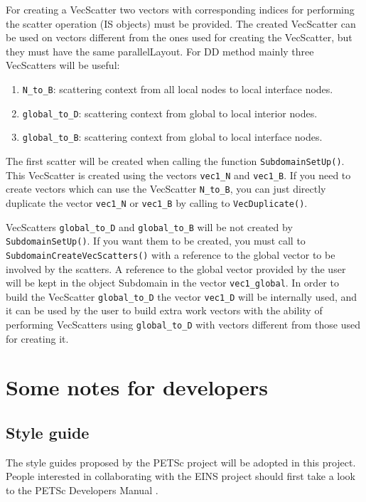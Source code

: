 \documentclass[a4paper,11pt]{report}
\begin{document}
For creating a VecScatter two vectors with corresponding indices
for performing the scatter operation (IS objects) must be
provided. The created VecScatter can be used on vectors different from
the ones used for creating the VecScatter, but they must have the same
parallelLayout. For DD method mainly three VecScatters will be useful:

\begin{enumerate}[noitemsep,topsep=2pt,parsep=2pt,partopsep=2pt]
\item \verb!N_to_B!: scattering context from all local nodes to local interface nodes. 
\item \verb!global_to_D!: scattering context from global to local interior nodes.
\item \verb!global_to_B!: scattering context from global to local interface nodes.
\end{enumerate}

The first scatter will be created when calling the function
\verb!SubdomainSetUp()!. This VecScatter is created using the vectors
\verb!vec1_N! and \verb!vec1_B!. If you need to create vectors which
can use the VecScatter \verb!N_to_B!, you can just directly duplicate
the vector \verb!vec1_N! or \verb!vec1_B! by calling to
\verb!VecDuplicate()!.

VecScatters \verb!global_to_D! and \verb!global_to_B! will be not
created by \verb!SubdomainSetUp()!. If you want them to be created,
you must call to \verb!SubdomainCreateVecScatters()! with a reference
to the global vector to be involved by the scatters. A reference to
the global vector provided by the user will be kept in the object
Subdomain in the vector \verb!vec1_global!. In order to build the
VecScatter \verb!global_to_D! the vector \verb!vec1_D! will be
internally used, and it can be used by the user to build extra work
vectors with the ability of performing VecScatters using
\verb!global_to_D! with vectors different from those used for creating
it.




\chapter{Some notes for developers}

\section{Style guide}

The style guides proposed by the PETSc project will be adopted in this
project. People interested in collaborating with the EINS project
should first take a look to the PETSc Developers Manual
\cite{petsc-dev}.
\end{document}
